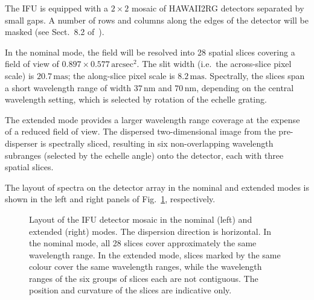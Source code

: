 The IFU is equipped with a $2\times2$ mosaic of HAWAII2RG detectors
separated by small gaps. A number of rows and columns along the edges
of the detector will be masked (see Sect.~8.2 of~\cite{DRLS}).

In the nominal mode, the field will be resolved into 28 spatial slices
covering a field of view of $0.897\times0.577\,\mathrm{arcsec^{2}}$.
The slit width (i.e.\ the across-slice pixel scale) is
$20.7\,\mathrm{mas}$; the along-slice pixel scale is
$8.2\,\mathrm{mas}$. Spectrally, the slices span a short wavelength
range of width $37\,\mathrm{nm}$ and $70\,\mathrm{nm}$, depending on
the central wavelength setting, which is selected by rotation of the
echelle grating.

The extended mode provides a larger wavelength range coverage at the
expense of a reduced field of view. The dispersed two-dimensional
image from the pre-disperser is spectrally sliced, resulting in six
non-overlapping wavelength subranges (selected by the echelle angle)
onto the detector, each with three spatial slices.

The layout of spectra on the detector array in the nominal and
extended modes is shown in the left and right panels of
Fig.~\ref{fig:IFU_detector_layout}, respectively.

\begin{figure}[ht]
  \centering
  \hfill
  \caption[IFU detector layout]{Layout of the IFU detector mosaic
    in the nominal (left) and extended (right) modes. The dispersion
    direction is horizontal. In the nominal mode, all 28 slices cover
    approximately the same wavelength range. In the extended mode, slices marked by
    the same colour cover the same wavelength ranges, while the
    wavelength ranges of the six groups of slices each are not
    contiguous. The position and curvature of the slices are
    indicative only. }
  \label{fig:IFU_detector_layout}
\end{figure}

